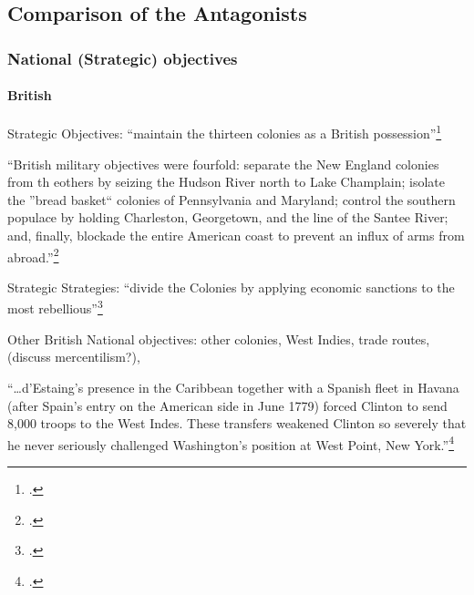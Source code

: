 \subsection{Comparison of the Antagonists}

% 



\subsubsection{National (Strategic) objectives}
\paragraph{British}

Strategic Objectives: ``maintain the thirteen colonies as a British possession''\footcite[2]{moncure_cowpens_1996}

``British military objectives were fourfold: separate the New England colonies from th eothers by seizing the Hudson River north to Lake Champlain; isolate the ''bread basket`` colonies of Pennsylvania and Maryland; control the southern populace by holding Charleston, Georgetown, and the line of the Santee River; and, finally, blockade the entire American coast to prevent an influx of arms from abroad.''\footcite[2]{moncure_cowpens_1996}

Strategic Strategies: ``divide the Colonies by applying economic sanctions to the most rebellious''\footcite[2]{moncure_cowpens_1996}

Other British National objectives: other colonies, West Indies, trade routes, (discuss mercentilism?), 

``\ldots d'Estaing's presence in the Caribbean together with a Spanish fleet in Havana (after Spain's entry on the American side in June 1779) forced Clinton to send 8,000 troops to the West Indes. These transfers weakened Clinton so severely that he never seriously challenged Washington's position at West Point, New York.''\footcite[10]{moncure_cowpens_1996}

